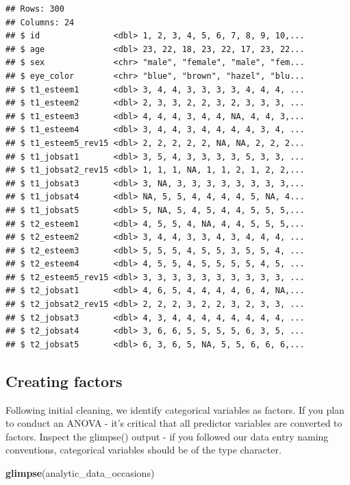 \documentclass[
]{krantz}
\makeatletter
\newenvironment{Shaded}{\begin{snugshade}}{\end{snugshade}}
\newcommand{\KeywordTok}[1]{\textcolor[rgb]{0.27,0.27,0.27}{\textbf{#1}}}
\newcommand{\NormalTok}[1]{#1}
\newenvironment{kframe}{%
\medskip{}
\setlength{\fboxsep}{.8em}
 \def\at@end@of@kframe{}%
 \ifinner\ifhmode%
  \def\at@end@of@kframe{\end{minipage}}%
  \begin{minipage}{\columnwidth}%
 \fi\fi%
 \def\FrameCommand##1{\hskip\@totalleftmargin \hskip-\fboxsep
 \colorbox{shadecolor}{##1}\hskip-\fboxsep
     \hskip-\linewidth \hskip-\@totalleftmargin \hskip\columnwidth}%
 \MakeFramed {\advance\hsize-\width
   \@totalleftmargin\z@ \linewidth\hsize
   \@setminipage}}%
 {\par\unskip\endMakeFramed%
 \at@end@of@kframe}
\renewenvironment{Shaded}{\begin{kframe}}{\end{kframe}}
\makeatother
\begin{document}
\begin{verbatim}
## Rows: 300
## Columns: 24
## $ id               <dbl> 1, 2, 3, 4, 5, 6, 7, 8, 9, 10,...
## $ age              <dbl> 23, 22, 18, 23, 22, 17, 23, 22...
## $ sex              <chr> "male", "female", "male", "fem...
## $ eye_color        <chr> "blue", "brown", "hazel", "blu...
## $ t1_esteem1       <dbl> 3, 4, 4, 3, 3, 3, 3, 4, 4, 4, ...
## $ t1_esteem2       <dbl> 2, 3, 3, 2, 2, 3, 2, 3, 3, 3, ...
## $ t1_esteem3       <dbl> 4, 4, 4, 3, 4, 4, NA, 4, 4, 3,...
## $ t1_esteem4       <dbl> 3, 4, 4, 3, 4, 4, 4, 4, 3, 4, ...
## $ t1_esteem5_rev15 <dbl> 2, 2, 2, 2, 2, NA, NA, 2, 2, 2...
## $ t1_jobsat1       <dbl> 3, 5, 4, 3, 3, 3, 3, 5, 3, 3, ...
## $ t1_jobsat2_rev15 <dbl> 1, 1, 1, NA, 1, 1, 2, 1, 2, 2,...
## $ t1_jobsat3       <dbl> 3, NA, 3, 3, 3, 3, 3, 3, 3, 3,...
## $ t1_jobsat4       <dbl> NA, 5, 5, 4, 4, 4, 4, 5, NA, 4...
## $ t1_jobsat5       <dbl> 5, NA, 5, 4, 5, 4, 4, 5, 5, 5,...
## $ t2_esteem1       <dbl> 4, 5, 5, 4, NA, 4, 4, 5, 5, 5,...
## $ t2_esteem2       <dbl> 3, 4, 4, 3, 3, 4, 3, 4, 4, 4, ...
## $ t2_esteem3       <dbl> 5, 5, 5, 4, 5, 5, 3, 5, 5, 4, ...
## $ t2_esteem4       <dbl> 4, 5, 5, 4, 5, 5, 5, 5, 4, 5, ...
## $ t2_esteem5_rev15 <dbl> 3, 3, 3, 3, 3, 3, 3, 3, 3, 3, ...
## $ t2_jobsat1       <dbl> 4, 6, 5, 4, 4, 4, 4, 6, 4, NA,...
## $ t2_jobsat2_rev15 <dbl> 2, 2, 2, 3, 2, 2, 3, 2, 3, 3, ...
## $ t2_jobsat3       <dbl> 4, 3, 4, 4, 4, 4, 4, 4, 4, 4, ...
## $ t2_jobsat4       <dbl> 3, 6, 6, 5, 5, 5, 5, 6, 3, 5, ...
## $ t2_jobsat5       <dbl> 6, 3, 6, 5, NA, 5, 5, 6, 6, 6,...
\end{verbatim}

\hypertarget{creating-factors-4}{%
\subsection{Creating factors}\label{creating-factors-4}}

Following initial cleaning, we identify categorical variables as factors. If you plan to conduct an ANOVA - it's critical that all predictor variables are converted to factors. Inspect the glimpse() output - if you followed our data entry naming conventions, categorical variables should be of the type character.

\begin{Shaded}
\begin{Highlighting}[]
\KeywordTok{glimpse}\NormalTok{(analytic_data_occasions)}
\end{Highlighting}
\end{Shaded}
\end{document}
